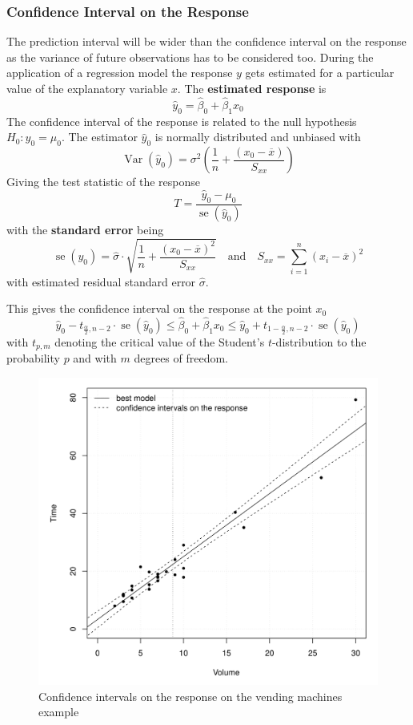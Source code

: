 \documentclass[11pt]{article}
\theoremstyle{definition}
\newcommand*\samplemean[1]{\overline{#1}}
\newcommand*\Var[1]{\mathop{\text{Var}}\left(#1\right)}
\newcommand*\se[1]{\mathop{\text{se}}\left(#1\right)}
\begin{document}
\subsubsection{Confidence Interval on the Response}
The prediction interval will be wider than the confidence interval on the response as the variance of future observations has to be considered too. During the application of a regression model the response $y$ gets estimated for a particular value of the explanatory variable $x$. The \textbf{estimated response} is
\begin{equation*}
	\hat{y}_0 = \hat{\beta}_0 + \hat{\beta}_1 x_0
\end{equation*}
The confidence interval of the response is related to the null hypothesis $H_0: \hat{y}_0 =\mu_0$. The estimator $\hat{y}_0$ is normally distributed and unbiased with
\begin{equation*}
	\Var{\hat{y}_0} = \sigma^2\left(\frac{1}{n} + \frac{(x_0 - \samplemean{x})}{S_{xx}}\right)
\end{equation*}
Giving the test statistic of the response
\begin{equation*}
	T = \frac{\hat{y}_0 - \mu_0}{\se{\hat{y}_0}}
\end{equation*}
with the \textbf{standard error} being
\begin{equation*}
	\se{y_0} = \hat{\sigma} \cdot \sqrt{\frac{1}{n} + \frac{(x_0 - \samplemean{x})^2}{S_{xx}}}\quad\text{and}\quad S_{xx} = \sum_{i=1}^{n}(x_i - \samplemean{x})^2
\end{equation*}
with estimated residual standard error $\hat{\sigma}$.

This gives the confidence interval on the response at the point $x_0$
\begin{equation*}
	\hat{y}_0 - t_{\frac{\alpha}{2}, n-2}\cdot\se{\hat{y}_0} \leq \hat{\beta}_0 + \hat{\beta}_1 x_0 \leq \hat{y}_0 + t_{1 - \frac{\alpha}{2}, n-2}\cdot\se{\hat{y}_0}
\end{equation*}
with $t_{p,m}$ denoting the critical value of the Student's $t$-distribution to the probability $p$ and with $m$ degrees of freedom.
\begin{figure}[H]
	\centering
	\includegraphics[width=0.5\linewidth]{img/confidence_interval_response_vending_machines}
	\caption{Confidence intervals on the response on the vending machines example}
	\label{fig:confidenceintervalresponsevendingmachines}
\end{figure}
\end{document}
